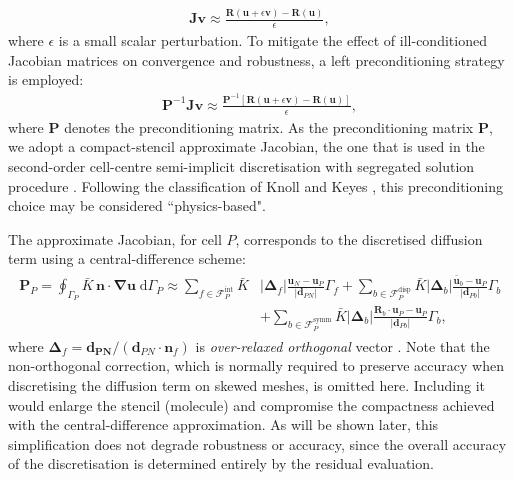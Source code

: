 \documentclass[review,3p]{elsarticle}
\newcommand{\bb}{\boldsymbol}
\begin{document}
%
\begin{eqnarray}
	\bb{J} \bb{v} \approx \frac{\bb{R}(\bb{u}+\epsilon \bb{v})-\bb{R}(\bb{u})}{\epsilon},
\end{eqnarray}
%
where $\epsilon$ is a small scalar perturbation.
To mitigate the effect of ill-conditioned Jacobian matrices on convergence and robustness, a left preconditioning strategy is employed:
%
\begin{eqnarray}\label{eq:jfnk}
	\bb{P}^{-1}\bb{J}  \bb{v}\approx 	\frac{\bb{P}^{-1}\left[\bb{R}(\bb{u} + \epsilon  \bb{v}) - \bb{R}(\bb{u})\right]}{\epsilon},
\end{eqnarray}
%
where $\bb{P}$ denotes the preconditioning matrix.
As the preconditioning matrix $\bb{P}$, we adopt a compact-stencil approximate Jacobian, the one that is used in the second-order cell-centre semi-implicit discretisation with segregated solution procedure \cite{Cardiff2018, Tukovic2018}. Following the classification of Knoll and Keyes \cite{Knoll2004}, this preconditioning choice may be considered ``physics-based".

The approximate Jacobian, for cell $P$, corresponds to the discretised diffusion term using a central-difference scheme:
%
\begin{eqnarray}
	\begin{split}
		\bb{P}_P = \oint_{\Gamma_P} \bar{K} \, \bb{n} \cdot \bb{\nabla} \bb{u} \; \text{d}\Gamma_P \approx
		\sum_{f \in \mathcal{F}^{\text{int}}_P}  \bar{K} &
		\left|\bb{\Delta}_{f} \right| \frac{ \bb{u}_{N} - \bb{u}_P}{\left|\bb{d}_{PN}\right|}    \Gamma_{f}
		+  \sum_{b \in \mathcal{F}^{\text{disp}}_P}  \bar{K}
		\left|\bb{\Delta}_{b} \right| \frac{ \bar{\bb{u}}_{b}  - \bb{u}_P}{\left|\bb{d}_{Pb}\right|}
		{\Gamma}_{b}    \\
		&	+ \sum_{b \in \mathcal{F}^{\text{symm}}_P}  \bar{K}
		\left|\bb{\Delta}_{b} \right| \frac{ \bb{R}_{b} \cdot \bb{u}_{P} - \bb{u}_P}{\left|\bb{d}_{Pb}\right|} {\Gamma}_{b},
	\end{split}
\end{eqnarray}
%
where $\bb{\Delta}_{f}=\bb{d_{PN}}/(\bb{d}_{PN} \cdot \bb{n}_f)$ is \emph{over-relaxed orthogonal} vector \cite{Demirdzic2015}.
Note that the non-orthogonal correction, which is normally required to preserve accuracy when discretising the diffusion term on skewed meshes, is omitted here.
Including it would enlarge the stencil (molecule) and compromise the compactness achieved with the central-difference approximation.
As will be shown later, this simplification does not degrade robustness or accuracy, since the overall accuracy of the discretisation is determined entirely by the residual evaluation.
\end{document}
